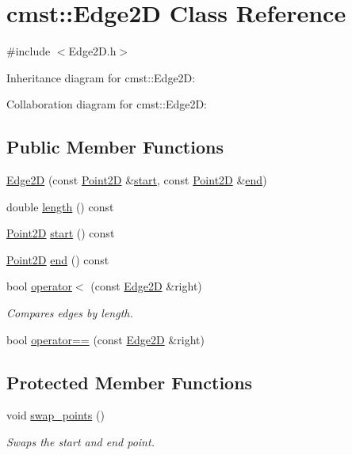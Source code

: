 \hypertarget{classcmst_1_1_edge2_d}{}\section{cmst\+:\+:Edge2D Class Reference}
\label{classcmst_1_1_edge2_d}


{\ttfamily \#include $<$Edge2\+D.\+h$>$}



Inheritance diagram for cmst\+:\+:Edge2D\+:


Collaboration diagram for cmst\+:\+:Edge2D\+:
\subsection*{Public Member Functions}
\begin{DoxyCompactItemize}
\item 
\hyperlink{classcmst_1_1_edge2_d_a0d1166315f84757395e889d3225e2ae0}{Edge2D} (const \hyperlink{classcmst_1_1_point2_d}{Point2D} \&\hyperlink{classcmst_1_1_edge2_d_ad77218c63818fe92f43033ba1487ab89}{start}, const \hyperlink{classcmst_1_1_point2_d}{Point2D} \&\hyperlink{classcmst_1_1_edge2_d_af02d43d8344759ac3709d318e26cdcee}{end})
\item 
double \hyperlink{classcmst_1_1_edge2_d_adaa859c8f6b412e1174abe8d8b429ce9}{length} () const 
\item 
\hyperlink{classcmst_1_1_point2_d}{Point2D} \hyperlink{classcmst_1_1_edge2_d_ad77218c63818fe92f43033ba1487ab89}{start} () const 
\item 
\hyperlink{classcmst_1_1_point2_d}{Point2D} \hyperlink{classcmst_1_1_edge2_d_af02d43d8344759ac3709d318e26cdcee}{end} () const 
\item 
bool \hyperlink{classcmst_1_1_edge2_d_a58bd75e0a118f5192f5811cfacb6e7ac}{operator$<$} (const \hyperlink{classcmst_1_1_edge2_d}{Edge2D} \&right)
\begin{DoxyCompactList}\small\item\em Compares edges by length. \end{DoxyCompactList}\item 
bool \hyperlink{classcmst_1_1_edge2_d_a1609ff699d629d691bf054acd2deb187}{operator==} (const \hyperlink{classcmst_1_1_edge2_d}{Edge2D} \&right)
\end{DoxyCompactItemize}
\subsection*{Protected Member Functions}
\begin{DoxyCompactItemize}
\item 
void \hyperlink{classcmst_1_1_edge2_d_aeb88dc66750f6c7967de0918e906abf4}{swap\+\_\+points} ()
\begin{DoxyCompactList}\small\item\em Swaps the start and end point. \end{DoxyCompactList}\end{DoxyCompactItemize}
